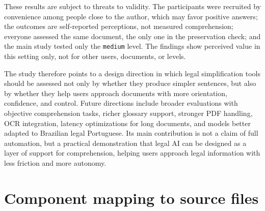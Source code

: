 \documentclass[english]{UNISINOSartigo} %
\begin{document}
These results are subject to threats to validity. The participants were recruited by convenience among people close to the author, which may favor positive answers; the outcomes are self-reported perceptions, not measured comprehension; everyone assessed the same document, the only one in the preservation check; and the main study tested only the \texttt{medium} level. The findings show perceived value in this setting only, not for other users, documents, or levels.

The study therefore points to a design direction in which legal simplification tools should be assessed not only by whether they produce simpler sentences, but also by whether they help users approach documents with more orientation, confidence, and control. Future directions include broader evaluations with objective comprehension tasks, richer glossary support, stronger PDF handling, OCR integration, latency optimizations for long documents, and models better adapted to Brazilian legal Portuguese. Its main contribution is not a claim of full automation, but a practical demonstration that legal AI can be designed as a layer of support for comprehension, helping users approach legal information with less friction and more autonomy.





\appendix
\section{Component mapping to source files}
\end{document}
